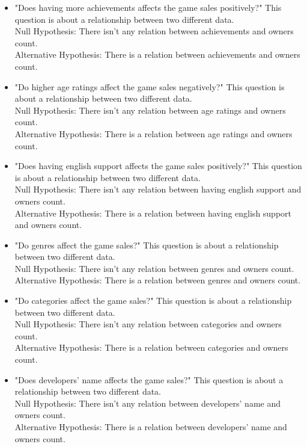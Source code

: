 \documentclass[conference]{IEEEtran}
\begin{document}
\begin{itemize}
    \item "Does having more achievements affects the game sales positively?" This question is about a relationship between two different data.\\Null
Hypothesis: There isn't any relation between achievements and owners count.\\ Alternative Hypothesis: There is a relation between achievements and owners count. \\
    \item "Do higher age ratings affect the game sales negatively?" This question is about a relationship between two different data.\\Null
Hypothesis: There isn't any relation between age ratings and owners count.\\ Alternative Hypothesis: There is a relation between age ratings and owners count. \\
    \item "Does having english support affects the game sales positively?" This question is about a relationship between two different data.\\Null
Hypothesis: There isn't any relation between having english support and owners count.\\ Alternative Hypothesis: There is a relation between having english support and owners count. \\
    \item "Do genres affect the game sales?" This question is about a relationship between two different data.\\Null
Hypothesis: There isn't any relation between genres and owners count.\\ Alternative Hypothesis: There is a relation between genres and owners count. \\
    \item "Do categories affect the game sales?" This question is about a relationship between two different data.\\Null
Hypothesis: There isn't any relation between categories and owners count.\\ Alternative Hypothesis: There is a relation between categories and owners count. \\
    \item "Does developers' name affects the game sales?" This question is about a relationship between two different data.\\Null
Hypothesis: There isn't any relation between developers' name and owners count.\\ Alternative Hypothesis: There is a relation between developers' name and owners count. \\

\end{itemize}
\end{document}
